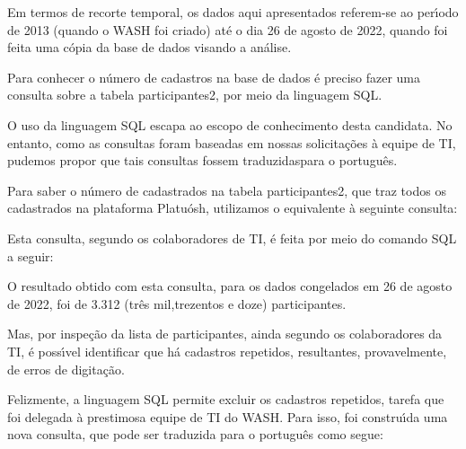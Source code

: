 \documentclass[
12pt,		%
openright,	%
twoside,  %
a4paper,			%
chapter=TITLE,		%
english,			%
french,				%
spanish,			%
brazil				%
]{USPSC-classe/USPSC}
\begin{document}
Em termos de recorte temporal, os dados aqui apresentados referem-se ao per\'{\i}odo de 2013 (quando o WASH foi criado) at\'e o dia 26 de agosto de 2022, quando foi feita uma c\'opia da base de dados visando a an\'alise.


Para conhecer o n\'umero de cadastros na base de dados \'e preciso fazer uma consulta sobre a tabela \textquotedbl participantes2\textquotedbl , por meio da linguagem SQL.


O uso da linguagem SQL escapa ao escopo de conhecimento desta candidata. No entanto, como as consultas foram baseadas em nossas solicita\c{c}\~oes \`a equipe de TI, pudemos propor que tais consultas fossem \textquotedbl traduzidas\textquotedbl  para o portugu\^es.


Para saber o n\'umero de cadastrados na tabela participantes2, que traz todos os cadastrados na plataforma Platu\'osh, utilizamos o equivalente \`a seguinte consulta:



\noindent\begin{center}\mbox{\centering{}}\end{center}





Esta consulta, segundo os colaboradores de TI, \'e feita por meio do comando SQL a seguir:



\noindent\begin{center}\mbox{\centering{}}\end{center}





O resultado obtido com esta consulta, para os dados congelados em 26 de agosto de 2022, foi de 3.312 (tr\^es mil,trezentos e doze) participantes.


Mas, por inspe\c{c}\~ao da lista de participantes, ainda segundo os colaboradores da TI, \'e poss\'{\i}vel identificar que h\'a cadastros repetidos, resultantes, provavelmente, de erros de digita\c{c}\~ao.


Felizmente, a linguagem SQL permite excluir os cadastros repetidos, tarefa que foi delegada \`a prestimosa equipe de TI do WASH. Para isso, foi constru\'{\i}da uma nova consulta, que pode ser traduzida para o portugu\^es como segue:
\end{document}
